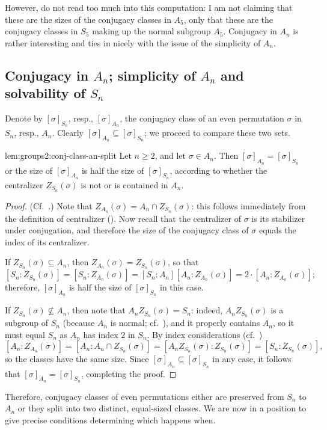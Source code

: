 However, do not read too much into this computation: I am not claiming
that these are the sizes of the conjugacy classes in $A_5$, only that
these are the conjugacy classes in $S_5$ making up the normal subgroup
$A_5$. Conjugacy in $A_n$ is rather interesting and ties in nicely
with the issue of the simplicity of $A_n$.

\subsection{Conjugacy in \texorpdfstring{$A_n$}{An}; simplicity of
  \texorpdfstring{$A_n$}{An} and solvability of
  \texorpdfstring{$S_n$}{Sn}}
\label{subsec:groups2:conjugacy-an-simplicity}
Denote by $[\sigma]_{S_n}$, resp., $[\sigma]_{A_n}$, the conjugacy
class of an even permutation $\sigma$ in $S_n$, resp., $A_n$. Clearly
$[\sigma]_{A_n} \subseteq [\sigma]_{S_n}$; we proceed to compare these
two sets.
\begin{lem}{}{lem:groups2:conj-class-an-split}
  Let $n \geq 2$, and let $\sigma \in A_n$. Then
  $[\sigma]_{A_n} = [\sigma]_{S_n}$ or the size of $[\sigma]_{A_n}$ is
  half the size of $[\sigma]_{S_n}$, according to whether the
  centralizer $Z_{S_n}(\sigma)$ is not or is contained in $A_n$.
\end{lem}

\begin{proof}
  (Cf.\ .)
  Note that $Z_{A_n}(\sigma) = A_n \cap Z_{S_n}(\sigma)$: this follows
  immediately from the definition of centralizer
  (). Now recall that the centralizer
  of $\sigma$ is its stabilizer under conjugation, and therefore the
  size of the conjugacy class of $\sigma$ equals the index of its
  centralizer.

  If $Z_{S_n}(\sigma) \subseteq A_n$, then
  $Z_{A_n}(\sigma) = Z_{S_n}(\sigma)$, so that
  \[ [S_n : Z_{S_n}(\sigma)] = [S_n : Z_{A_n}(\sigma)] = [S_n :
    A_n][A_n : Z_{A_n}(\sigma)] = 2 \cdot [A_n : Z_{A_n}(\sigma)];
  \]
  therefore, $[\sigma]_{A_n}$ is half the size of $[\sigma]_{S_n}$ in
  this case.

  If $Z_{S_n}(\sigma) \not\subseteq A_n$, then note that
  $A_n Z_{S_n}(\sigma) = S_n$: indeed, $A_n Z_{S_n}(\sigma)$ is a
  subgroup of $S_n$ (because $A_n$ is normal; cf.\
  ), and it properly
  contains $A_n$, so it must equal $S_n$ as $A_n$ has index $2$ in
  $S_n$. By index considerations (cf.\
  )
  \[ [A_n : Z_{A_n}(\sigma)] = [A_n : A_n \cap Z_{S_n}(\sigma)] = [A_n
    Z_{S_n}(\sigma) : Z_{S_n}(\sigma)] = [S_n : Z_{S_n}(\sigma)],
  \]
  so the classes have the same size. Since
  $[\sigma]_{A_n} \subseteq [\sigma]_{S_n}$ in any case, it follows
  that $[\sigma]_{A_n} = [\sigma]_{S_n}$, completing the proof.
\end{proof}
Therefore, conjugacy classes of even permutations either are preserved
from $S_n$ to $A_n$ or they split into two distinct, equal-sized
classes. We are now in a position to give precise conditions
determining which happens when.

